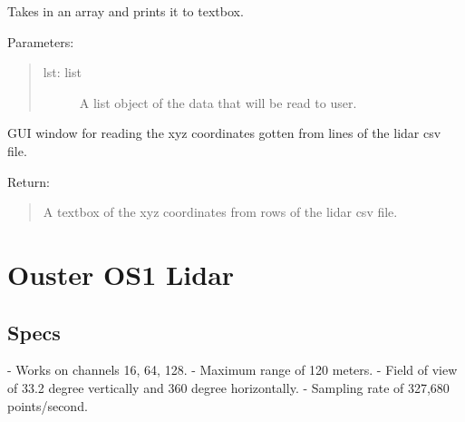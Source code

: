 \documentclass[letterpaper,10pt,english]{sphinxmanual}
\begin{document}
\begin{fulllineitems}
\label{\detokenize{Lidar extraction tool:test_lidar_gui.print_list}}
Takes in an array and prints it to textbox.

Parameters:
\begin{quote}
\begin{description}
\item[{lst: list}] \leavevmode
A list object of the data that will be read to user.

\end{description}
\end{quote}

\end{fulllineitems}


\begin{fulllineitems}
\label{\detokenize{Lidar extraction tool:test_lidar_gui.xyz_calc}}
GUI window for reading the xyz coordinates gotten from lines of the lidar csv file.

Return:
\begin{quote}

A textbox of the xyz coordinates from rows of the lidar csv file.
\end{quote}

\end{fulllineitems}



\section{Ouster OS1 Lidar}
\label{\detokenize{Ouster lidar:ouster-os1-lidar}}\label{\detokenize{Ouster lidar::doc}}

\subsection{Specs}
\label{\detokenize{Ouster lidar:specs}}
- Works on channels 16, 64, 128.
- Maximum range of 120 meters.
- Field of view of 33.2 degree vertically and 360 degree horizontally.
- Sampling rate of 327,680 points/second.
\end{document}
